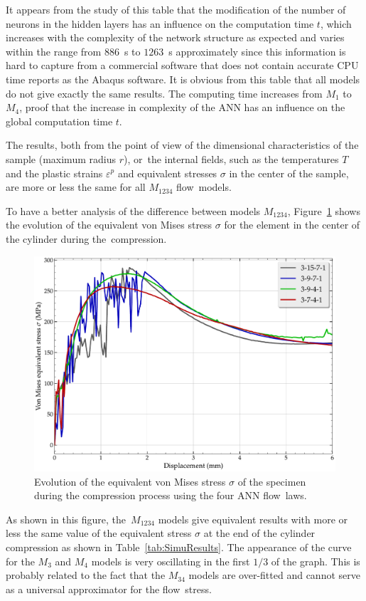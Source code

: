 \documentclass[algorithms,article,accept,pdftex,oneauthors]{Definitions/mdpi}
\begin{document}
\vspace{-6pt}

It appears from the study of this table that the modification of the number of neurons in the hidden layers has an influence on the computation time $t$, which increases with the complexity of the network structure as expected and varies within the range from $886$~s to $1263$~s approximately since this information is hard to capture from a commercial software that does not contain accurate CPU time reports as the Abaqus software.
It is obvious from this table that all models do not give exactly the same results.
The computing time increases from $M_{1}$ to $M_4$, proof that the increase in complexity of the ANN has an influence on the global computation time $t$.

The results, both from the point of view of the dimensional characteristics of the sample (maximum radius $r$), or~the internal fields, such as the temperatures $T$ and the plastic strains $\varepsilon^p$ and equivalent stresses $\sigma$ in the center of the sample, are more or less the same for all $M_{1234}$ flow~models.

To have a better analysis of the difference between models $M_{1234}$, Figure~\ref{fig:misesCurve} shows the evolution of the equivalent von Mises stress $\sigma$ for the element in the center of the cylinder during the~compression.
\begin{figure}[H]
\includegraphics[width=0.72\columnwidth]{Figures/vonMisesCurve}
\caption{Evolution of the equivalent von Mises stress $\sigma$ of the specimen during the compression process using the four ANN flow~laws.}
\label{fig:misesCurve}
\end{figure}
As shown in this figure, the~$M_{1234}$ models give equivalent results with more or less the same value of the equivalent stress $\sigma$ at the end of the cylinder compression as shown in Table~\ref{tab:SimuResults}.
The appearance of the curve for the $M_3$ and $M_4$ models is very oscillating in the first $1/3$ of the graph.
This is probably related to the fact that the $M_{34}$ models are over-fitted and cannot serve as a universal approximator for the flow~stress.
\end{document}
